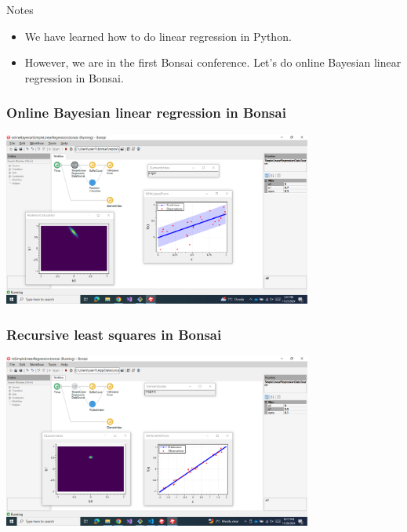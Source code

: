 \begin{frame}

\begin{alertblock}{Notes}
    \begin{itemize}

        \item We have learned how to do linear regression in Python.

        \item However, we are in the first Bonsai conference. Let's do online
            Bayesian linear regression in Bonsai.

    \end{itemize}
\end{alertblock}

\end{frame}

\begin{frame}
    \frametitle{Online Bayesian linear regression in Bonsai}

    \begin{center}
        \href{https://github.com/joacorapela/bonsai-oblrSimpleLinearRegressionDemo}{\includegraphics[width=4.0in]{figures/workflowOBLR.png}}
    \end{center}

\end{frame}

\begin{frame}
    \frametitle{Recursive least squares in Bonsai}

    \begin{center}
        \href{https://github.com/joacorapela/bonsai-rlsSimpleLinearRegression}{\includegraphics[width=4.0in]{figures/workflowRLS.png}}
    \end{center}

\end{frame}

